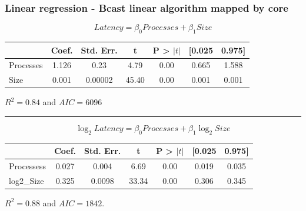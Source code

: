 \documentclass{beamer}
\begin{document}
\begin{frame}
    \frametitle{Linear regression - Bcast linear algorithm mapped by core}

    \begin{equation}
        Latency = \beta_0 Processes + \beta_1 Size
    \end{equation}
    \vspace{-1cm}
    \begin{table}[htbp]
        \centering
        \begin{tabular}{lcccccc}
        \hline
         & Coef. & Std. Err. & t & P \textgreater{} $|t|$ & [0.025 & 0.975] \\
        \hline
        Processes & 1.126 & 0.23 & 4.79 & 0.00 & 0.665 & 1.588 \\
        Size & 0.001 & 0.00002 & 45.40 & 0.00 & 0.001 & 0.001 \\
        \hline
        \end{tabular}
    \end{table}
    $R^2 = 0.84$ and $AIC = 6096$


    \rule{\textwidth}{3pt}

    \begin{equation}
        \log_{2}Latency = \beta_0 Processes + \beta_1 \log_{2} Size
    \end{equation}
    \vspace{-1cm}
    \begin{table}[htbp]
        \centering
        \begin{tabular}{lcccccc}
        \hline
         & Coef. & Std. Err. & t & P \textgreater{} $|t|$ & [0.025 & 0.975] \\
        \hline
        Processess & 0.027 & 0.004 & 6.69 & 0.00 & 0.019 & 0.035 \\
        log2\_Size & 0.325 & 0.0098& 33.34 & 0.00 & 0.306 & 0.345 \\
        \hline
        \end{tabular}
    \end{table}
    
    $R^2 = 0.88$ and $AIC = 1842$.
    
\end{frame}
\end{document}
